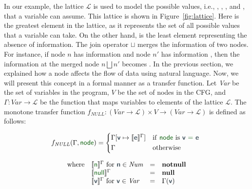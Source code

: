 In our example, the lattice $\mathcal{L}$ is used to model the possible values, 
i.e., , , , and , that a variable can assume.
This lattice is shown in Figure~\ref{fig:lattice}. Here  is
the greatest element in the lattice, as it represents the set of all possible values
that a variable can take. On the other hand,  is the least element
representing the absence of information.
The join operator $\sqcup$ merges the information of two nodes. For instance, if node $n$ has information  and node $n'$ has
information , then the information at the merged node $n \bigsqcup n'$
becomes .
In the previous section, we explained how a node affects the flow of data
using natural language. Now, we will present this concept in a formal manner
as a transfer function. Let \textit{Var} be the set of variables in the program,
$V$ be the set of nodes in the CFG, and  $\Gamma:\textit{Var} \rightarrow \mathcal{L}$
be the function that maps variables to elements of the lattice $\mathcal{L}$.
The monotone transfer function $f_{\textit{NULL}}: (\textit{Var} \rightarrow \mathcal{L}) \times V \rightarrow (\textit{Var} \rightarrow \mathcal{L})$
is defined as follows:

\[
  f_{\textit{NULL}}(\Gamma, \vterminal{node}) =
  \begin{cases*}
  \Gamma[\vmetavar{v} \mapsto \semNPA{\vmetavar{e}}^\Gamma] & if  \vterminal{node} is \vterminal{\vmetavar{v} = \vmetavar{e}}  \\
  \Gamma  & otherwise
\end{cases*} \]%

\[
\begin{array}{llcl}
\textrm{where}&\semNPA{\vterminal{n}}^\Gamma  \text{ for } \vmetavar{n}\in \textit{Num}			&=& \textbf{notnull}\\
&\semNPA{\vterminal{null}}^\Gamma			&=& \textbf{null}\\
&\semNPA{\vmetavar{v}}^\Gamma \text{ for } \vmetavar{v}\in \textit{Var}				&=& \Gamma(\vmetavar{v}) \\
\end{array}
\]


